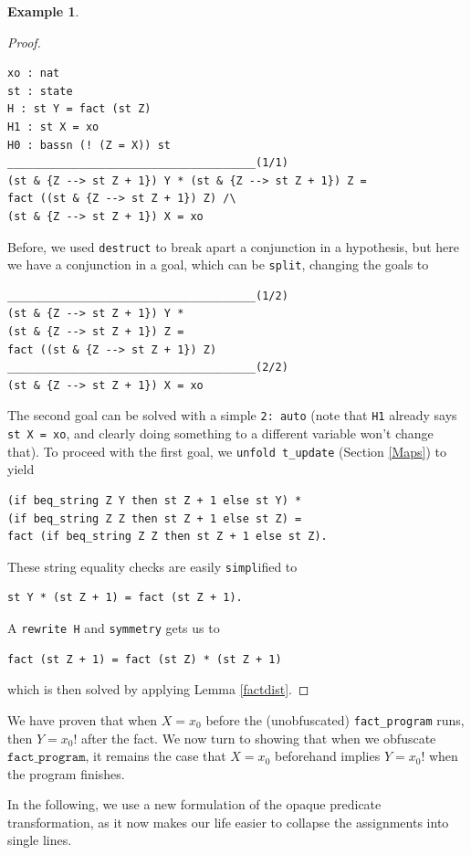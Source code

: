 \documentclass[12pt,notitlepage]{report}
\theoremstyle{plain}
\theoremstyle{definition}
\newtheorem{example}[theo]{Example}
\numberwithin{equation}{section}
\begin{document}
\begin{example}
\begin{proof}
\begin{verbatim}
xo : nat
st : state
H : st Y = fact (st Z)
H1 : st X = xo
H0 : bassn (! (Z = X)) st
______________________________________(1/1)
(st & {Z --> st Z + 1}) Y * (st & {Z --> st Z + 1}) Z =
fact ((st & {Z --> st Z + 1}) Z) /\
(st & {Z --> st Z + 1}) X = xo
\end{verbatim}
Before, we used \verb$destruct$ to break apart a conjunction in a hypothesis, but here we have a conjunction in a goal, which can be \verb$split$, changing the goals to
\begin{verbatim}
______________________________________(1/2)
(st & {Z --> st Z + 1}) Y *
(st & {Z --> st Z + 1}) Z =
fact ((st & {Z --> st Z + 1}) Z)
______________________________________(2/2)
(st & {Z --> st Z + 1}) X = xo
\end{verbatim}
The second goal can be solved with a simple \verb$2: auto$ (note that \verb$H1$ already says \verb$st X = xo$, and clearly doing something to a different variable won't change that).  To proceed with the first goal, we \verb$unfold t_update$ (Section \ref{Maps}) to yield
\begin{verbatim}
(if beq_string Z Y then st Z + 1 else st Y) *
(if beq_string Z Z then st Z + 1 else st Z) =
fact (if beq_string Z Z then st Z + 1 else st Z).
\end{verbatim}
These string equality checks are easily \verb$simpl$ified to
\begin{verbatim}
st Y * (st Z + 1) = fact (st Z + 1).
\end{verbatim}
A \verb$rewrite H$ and \verb$symmetry$ gets us to
\begin{verbatim}
fact (st Z + 1) = fact (st Z) * (st Z + 1)
\end{verbatim}
which is then solved by applying Lemma \ref{factdist}.
\end{proof}
\end{example}

We have proven that when $X = x_0$ before the (unobfuscated) \texttt{fact\_program} runs, then $Y = x_0!$ after the fact.  We now turn to showing that when we obfuscate $\texttt{fact\_program}$, it remains the case that $X = x_0$ beforehand implies $Y = x_0!$ when the program finishes.

\par

In the following, we use a new formulation of the opaque predicate transformation, as it now makes our life easier to collapse the assignments into single lines.
\end{document}
